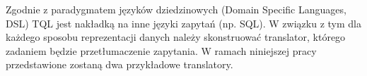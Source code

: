 Zgodnie z paradygmatem języków dziedzinowych (Domain Specific Languages, DSL) TQL jest nakładką na inne języki zapytań (np. SQL).
W związku z tym dla każdego sposobu reprezentacji danych należy skonstruować translator, 
którego zadaniem będzie przetłumaczenie zapytania. 
W ramach niniejszej pracy przedstawione zostaną dwa przykładowe translatory.
